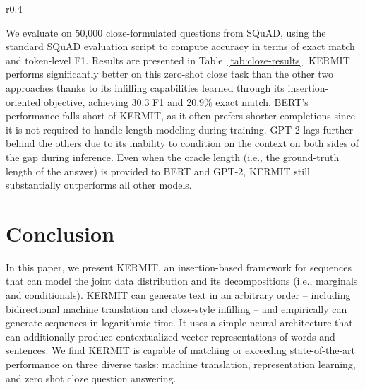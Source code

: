\documentclass{article}
\begin{document}
\begin{wraptable}[10]{r}{0.4\linewidth}
\vspace{-1em}
\small
\centering
{}
\caption{SQuAD zero-shot cloze question answering.}
\label{tab:cloze-results}
\end{wraptable}

We evaluate on 50,000 cloze-formulated questions from SQuAD, using the standard SQuAD evaluation script to compute accuracy in terms of exact match and token-level F1. Results are presented in Table~\ref{tab:cloze-results}.
KERMIT performs significantly better on this zero-shot cloze task than the other two approaches thanks to its infilling capabilities learned through its insertion-oriented objective, achieving 30.3 F1 and 20.9\% exact match. BERT's performance falls short of KERMIT, as it often prefers shorter completions since it is not required to handle length modeling during training. GPT-2 lags further behind the others due to its inability to condition on the context on both sides of the gap during inference. Even when the oracle length (i.e., the ground-truth length of the answer) is provided to BERT and GPT-2, KERMIT still substantially outperforms all other models. 
\section{Conclusion}
In this paper, we present KERMIT, an insertion-based framework for sequences that can model the joint data distribution and its decompositions (i.e., marginals and conditionals). KERMIT can generate text in an arbitrary order -- including bidirectional machine translation and cloze-style infilling -- and empirically can generate sequences in logarithmic time. It uses a simple neural architecture that can additionally produce contextualized vector representations of words and sentences. We find KERMIT is capable of matching or exceeding state-of-the-art performance on three diverse tasks: machine translation, representation learning, and zero shot cloze question answering.
\end{document}
